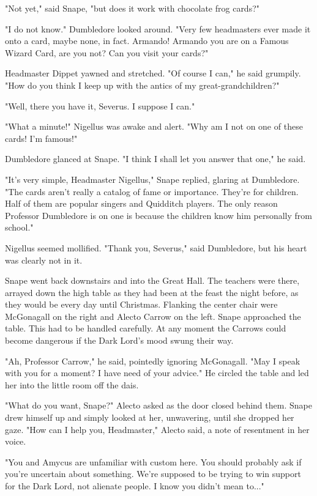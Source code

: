 \documentclass[a4paper,11pt]{article}
\begin{document}
"Not yet," said Snape, "but does it work with chocolate frog cards?"

"I do not know." Dumbledore looked around. "Very few headmasters ever made it onto a card, maybe none, in fact. Armando! Armando you are on a Famous Wizard Card, are you not? Can you visit your cards?"

Headmaster Dippet yawned and stretched. "Of course I can," he said grumpily. "How do you think I keep up with the antics of my great-grandchildren?"

"Well, there you have it, Severus. I suppose I can."

"What a minute!" Nigellus was awake and alert. "Why am I not on one of these cards! I'm famous!"

Dumbledore glanced at Snape. "I think I shall let you answer that one," he said.

"It's very simple, Headmaster Nigellus," Snape replied, glaring at Dumbledore. "The cards aren't really a catalog of fame or importance. They're for children. Half of them are popular singers and Quidditch players. The only reason Professor Dumbledore is on one is because the children know him personally from school."

Nigellus seemed mollified. "Thank you, Severus," said Dumbledore, but his heart was clearly not in it.

Snape went back downstairs and into the Great Hall. The teachers were there, arrayed down the high table as they had been at the feast the night before, as they would be every day until Christmas. Flanking the center chair were McGonagall on the right and Alecto Carrow on the left. Snape approached the table. This had to be handled carefully. At any moment the Carrows could become dangerous if the Dark Lord's mood swung their way.

"Ah, Professor Carrow," he said, pointedly ignoring McGonagall. "May I speak with you for a moment? I have need of your advice." He circled the table and led her into the little room off the dais.

"What do you want, Snape?" Alecto asked as the door closed behind them. Snape drew himself up and simply looked at her, unwavering, until she dropped her gaze. "How can I help you, Headmaster," Alecto said, a note of resentment in her voice.

"You and Amycus are unfamiliar with custom here. You should probably ask if you're uncertain about something. We're supposed to be trying to win support for the Dark Lord, not alienate people. I know you didn't mean to..."
\end{document}
